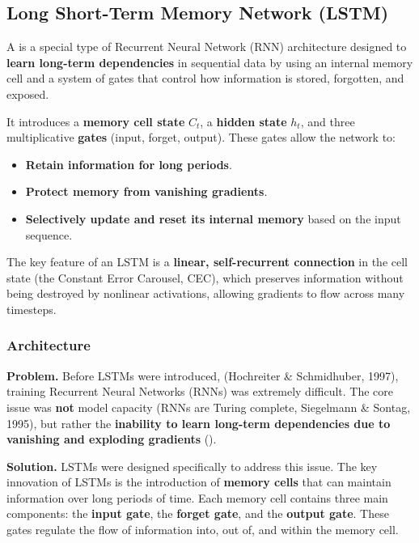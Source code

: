 \subsection{Long Short-Term Memory Network (LSTM)}

\begin{definitionbox}
    A  is a special type of Recurrent Neural Network (RNN) architecture designed to \textbf{learn long-term dependencies} in sequential data by using an internal memory cell and a system of gates that control how information is stored, forgotten, and exposed.

    \highspace
    It introduces a \textbf{memory cell state} $C_t$, a \textbf{hidden state} $h_t$, and three multiplicative \textbf{gates} (input, forget, output). These gates allow the network to:
    \begin{itemize}
        \item \textbf{Retain information for long periods}.
        \item \textbf{Protect memory from vanishing gradients}.
        \item \textbf{Selectively update and reset its internal memory} based on the input sequence.
    \end{itemize}
    The key feature of an LSTM is a \textbf{linear, self-recurrent connection} in the cell state (the Constant Error Carousel, CEC), which preserves information without being destroyed by nonlinear activations, allowing gradients to flow across many timesteps.
\end{definitionbox}

\subsubsection{Architecture}

\textcolor{Red2}{ \textbf{Problem.}} Before LSTMs were introduced, (Hochreiter \& Schmidhuber, 1997), training Recurrent Neural Networks (RNNs) was extremely difficult. The core issue was \textbf{not} model capacity (RNNs are Turing complete, Siegelmann \& Sontag, 1995), but rather the \textbf{inability to learn long-term dependencies due to vanishing and exploding gradients} ().

\highspace
\textcolor{Green3}{ \textbf{Solution.}} LSTMs were designed specifically to address this issue. The key innovation of LSTMs is the introduction of \textbf{memory cells} that can maintain information over long periods of time. Each memory cell contains three main components: the \textbf{input gate}, the \textbf{forget gate}, and the \textbf{output gate}. These gates regulate the flow of information into, out of, and within the memory cell.

